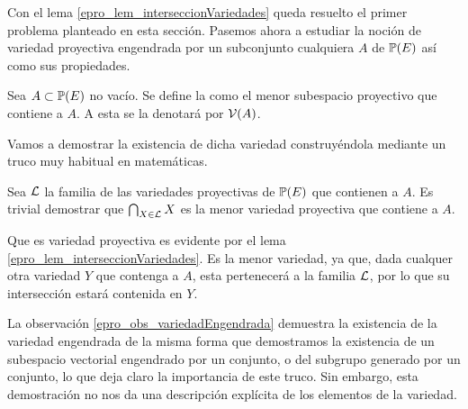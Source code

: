 Con el lema \ref{epro_lem_interseccionVariedades} queda resuelto el primer problema planteado en esta sección. Pasemos ahora a estudiar la noción de variedad proyectiva engendrada por un subconjunto cualquiera $A$ de $\mathbb{P}(E)$ así como sus propiedades.
\begin{defi}
	\label{epro_def_variedadEngendrada}
	Sea $A\subset\mathbb{P}(E)$ no vacío. Se define la  como el menor subespacio proyectivo que contiene a $A$. A esta se la denotará por $\mathcal{V}(A)$.
\end{defi}
Vamos a demostrar la existencia de dicha variedad construyéndola mediante un truco muy habitual en matemáticas.
\begin{obs}
	\label{epro_obs_variedadEngendrada}
	Sea $\mathcal{L}$ la familia de las variedades proyectivas de $\mathbb{P}(E)$ que contienen a $A$. Es trivial demostrar que $\bigcap_{X\in\mathcal{L}}X$ es la menor variedad proyectiva que contiene a $A$.
	
	Que es variedad proyectiva es evidente por el lema \ref{epro_lem_interseccionVariedades}. Es la menor variedad, ya que, dada cualquer otra variedad $Y$ que contenga a $A$, esta pertenecerá a la familia $\mathcal{L}$, por lo que su intersección estará contenida en $Y$.
\end{obs}
La observación \ref{epro_obs_variedadEngendrada} demuestra la existencia de la variedad engendrada de la misma forma que demostramos la existencia de un subespacio vectorial engendrado por un conjunto, o del subgrupo generado por un conjunto, lo que deja claro la importancia de este truco. Sin embargo, esta demostración no nos da una descripción explícita de los elementos de la variedad.

